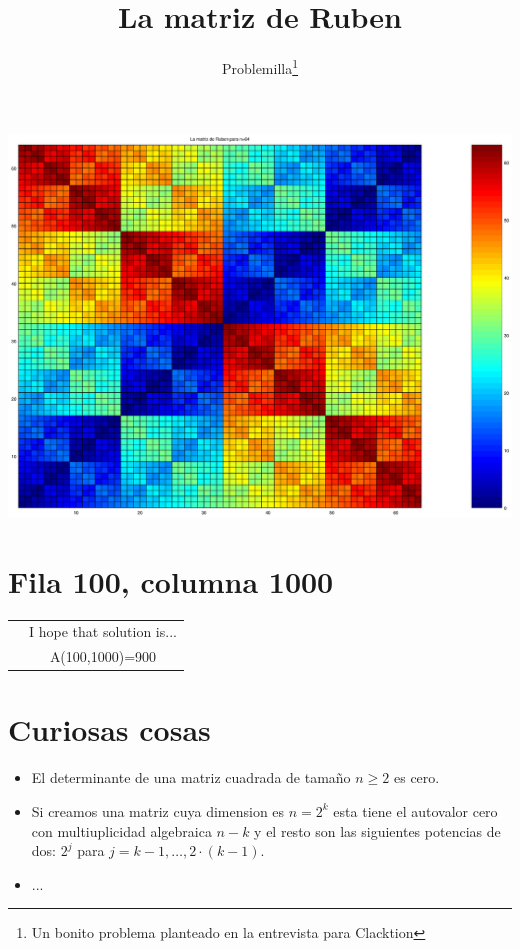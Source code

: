 \documentclass[oneside]{scrartcl}
\title{La matriz de Ruben}
\author{Problemilla\thanks{Un bonito problema planteado en la entrevista para Clacktion}}
\date{}
\newcommand{\MQsorprendido}{\begin{tikzpicture}[scale=0.25]
\filldraw[fill=red!20!white, draw=red!50!black]
(2,2) -- (0,0)-- (2,1) -- (2.5,0) -- (3,1) -- (5,0) -- (3,2) -- (2,2);
\filldraw[fill=orange, draw=orange!50!black] (0,0) .. controls (-7,-7) and (7,-7) .. (5,0);
\filldraw[fill=orange, draw=orange!50!black]  (0,0)-- (2,1) -- (2.5,0)--(2.5,0) -- (3,1) -- (5,0);
\draw[line width=3pt]  (0,-0.5)-- (2,0.5) -- (2.5,-0.5)--(2.5,-0.5) -- (3,0.5) -- (5,-0.5);
\draw[line width=3pt]  (2.5,0.9)-- (2,3.2)
                       (2.5,0.9)--(2.5,3.7)
                       (2.5,0.9) -- (3,3.2);

\draw[line width=3pt, color=green!50!black]  (4.5,-1)--(6,0.2);
\draw[line width=3pt, color=green!50!black]  (0.5,-1)--(-1,0.2);

\filldraw[fill=green!20!white, draw=green!50!black,line width=3pt ]
(1.5,-1) circle (1cm)
(3.5,-1) circle (1cm);

\filldraw[fill=blue, draw=blue!50!black]
(1.5,-1) circle (0.3cm)
(3.5,-1) circle (0.3cm);


\filldraw[fill=black, draw=black!50!black]
(1.5,-1) circle (0.15cm)
(3.5,-1) circle (0.15cm);

\filldraw[fill=red!20!white, draw=red!50!black]
(2,-3) circle (0.8cm);
\filldraw[fill=black, draw=black]
(2,-3) circle (0.2cm);
\end{tikzpicture}
}
\newcommand{\MQsonriente}{\begin{tikzpicture}[scale=0.25]
\filldraw[fill=red!20!white, draw=red!50!black]
(2,2) -- (0,0)-- (2,1) -- (2.5,0) -- (3,1) -- (5,0) -- (3,2) -- (2,2);
\filldraw[fill=orange, draw=orange!50!black] (0,0) .. controls (-7,-7) and (7,-7) .. (5,0);
\filldraw[fill=orange, draw=orange!50!black]  (0,0)-- (2,1) -- (2.5,0)--(2.5,0) -- (3,1) -- (5,0);
\draw[line width=3pt]  (0,-0.5)-- (2,0.5) -- (2.5,-0.5)--(2.5,-0.5) -- (3,0.5) -- (5,-0.5);
\draw[line width=3pt]  (2.5,0.9)-- (2,3.2)
                       (2.5,0.9)--(2.5,3.7)
                       (2.5,0.9) -- (3,3.2);

\draw[line width=3pt, color=green!50!black]  (4.5,-1)--(6,0.2);
\draw[line width=3pt, color=green!50!black]  (0.5,-1)--(-1,0.2);

\filldraw[fill=green!20!white, draw=green!50!black,line width=3pt ]
(1.5,-1) circle (1cm)
(3.5,-1) circle (1cm);

\filldraw[fill=blue, draw=blue!50!black]
(1.5,-1) circle (0.3cm)
(3.5,-1) circle (0.3cm);


\filldraw[fill=black, draw=black!50!black]
(1.5,-1) circle (0.15cm)
(3.5,-1) circle (0.15cm);

\draw[line width=3pt, color=black!50!black]  (1,-2.5)--(2,-3.5)--(2.7,-2.2);
\end{tikzpicture}
}
\begin{document}
\maketitle


\begin{center}
\includegraphics[scale=0.3]{MatrizRuben.eps}
\end{center}




\section{Fila 100, columna 1000}
\begin{center}
\begin{tabular}{cc}
\MQsorprendido & I hope that solution is...\\
\MQsonriente  & \huge{A(100,1000)=900}\\
\end{tabular}
\end{center}

\section{Curiosas cosas}
\begin{itemize}
\item El determinante de una matriz cuadrada de tamaño 
$n\geq 2$ es cero.
\item Si creamos una matriz cuya dimension es $n=2^k$ esta tiene el autovalor cero con multiuplicidad algebraica $n-k$ y el resto son las siguientes potencias de dos: $2^j$ para $j=k-1,\dots,2\cdot(k-1)$.
\item ...
\end{itemize}
\end{document}
